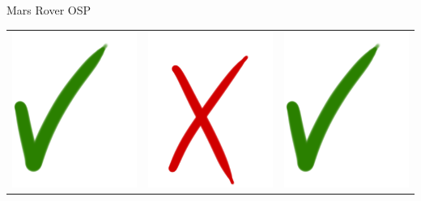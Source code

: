 \begin{frame}{Mars Rover OSP}
{\begin{tabular}{c|c|c}
\includegraphics[scale=0.1]{yes.png} &
\includegraphics[scale=0.1]{no.png} &
\includegraphics[scale=0.1]{yes.png} \\

\end{tabular}
}

\medskip

\end{frame}


